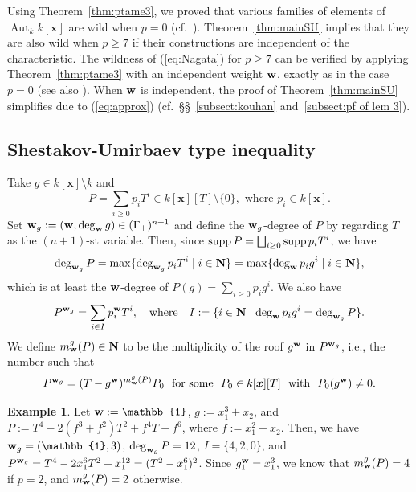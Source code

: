 \documentclass{amsart}
\theoremstyle{plain}
\theoremstyle{definition}
\newtheorem{example}[thm]{Example}
\newcommand{\zs}{\{ 0\} }
\newcommand{\sm}{\setminus}
\newcommand{\Aut }{\mathop{\mathrm{Aut}}\nolimits}
\newcommand{\N}{{\bf N}}
\newcommand{\x}{{\boldsymbol x}}
\newcommand{\w}{{\bf w}}
\newcommand{\kx}{k[\x]}
\newcommand{\degww  }{\mathop{\rm deg}_{\w }\nolimits}
\newcommand{\supp }{\mathop{\rm supp}\nolimits}
\begin{document}
Using Theorem~\ref{thm:ptame3}, 
we proved that various families of 
elements of $\Aut _k\kx $ 
are wild when $p=0$ 
(cf.\ \cite{wild3, Sugaku, GABA}). 
Theorem~\ref{thm:mainSU} implies that 
they are also wild when $p\ge 7$ 
if their constructions are independent of the characteristic. 
The wildness of (\ref{eq:Nagata}) for $p\ge 7$ can be verified 
by applying Theorem~\ref{thm:ptame3} with an independent 
weight $\w $, 
exactly as in the case $p=0$ \cite[p.\ 79]{tame3} 
(see also \cite[p.\,11, Exercise 11]{JC}). 
When $\w $ is independent, 
the proof of Theorem~\ref{thm:mainSU} 
simplifies due to (\ref{eq:approx}) 
(cf.\ \S\S ~\ref{subsect:kouhan} and~\ref{subsect:pf of lem 3}). 




\subsection{Shestakov-Umirbaev type inequality}\label{subsect:SUineq}


Take $g\in \kx \sm k$ and  
\begin{equation}\label{eq:Pick any P}
P=\sum _{i\ge 0}p_iT^i\in \kx [T]\sm \zs , 
\text{ where }p_i\in \kx . 
\end{equation}
Set $\w _g:=(\w ,\degww  g)\in (\Gamma _+)^{n+1}$ 
and define the $\w _g$-degree 
of $P$ by regarding $T$ as the $(n+1)$-st variable. 
Then, 
since $\supp P=\bigsqcup _{i\ge 0}\supp p_iT^i$, 
we have 
\begin{equation}\label{eq:degw_gP}
\deg _{\w _g}P
=\max \{ \deg _{\w _g}p_iT^i\mid i\in \N \} 
=\max \{ \degww  p_ig^i\mid i\in \N \} , 
\end{equation}
which is at least 
the $\w $-degree of $P(g)=\sum _{i\ge 0}p_ig^i$. 
We also have 
\begin{equation}\label{eq:P(T)^w_g1}
P^{\w _g}=\sum _{i\in I}p_i^{\w }T^i, 
\quad \text{where}\quad 
I:=\{ i\in \N \mid \degww  p_ig^i=\deg _{\w _g}P\} . 
\end{equation}
We define $m_{\w }^g(P)\in \N $ to 
be the multiplicity of 
the roof $g^{\w }$ in $P^{\w _g}$, 
i.e., the number such that 
\begin{equation}\label{eq:P(T)^w_g2}
P^{\w _g}=(T-g^{\w })^{m_{\w }^g(P)}P_0
\text{ \ for some \ $P_0\in \kx [T]$ \ with \ $P_0(g^{\w })\ne 0$}.
\end{equation}


\begin{example}\label{ex:setting}
Let $\w :=\mathbb{1}$, 
$g:=x_1^3+x_2$, 
and $P:=T^4-2(f^3+f^2)T^2+f^4T+f^6$, 
where $f:=x_1^2+x_2$. 
Then, 
we have $\w _g=(\mathbb{1},3)$, 
$\deg _{\w _g}P=12$, $I=\{ 4,2,0\} $, 
and 
$P^{\w _g}=T^4-2x_1^6T^2+x_1^{12}=(T^2-x_1^6)^2$. 
Since $g_1^{\w }=x_1^3$, 
we know that $m_{\w }^g(P)=4$ if $p=2$, 
and $m_{\w }^g(P)=2$ otherwise. 
\end{example}
\end{document}
